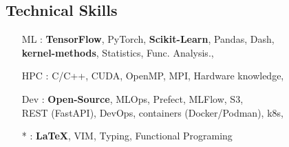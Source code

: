 \documentclass[10pt]{article} %
\begin{document}
\begin{paracol}{2}
\section{Technical Skills}
%
%
%
%
%
%
%
\begin{itemize}[noitemsep]
    \item[ML]: \textbf{TensorFlow}, PyTorch, \textbf{Scikit-Learn},
      Pandas, Dash, \\ \textbf{kernel-methods}, Statistics, Func.
      Analysis.,
    \item[HPC]: C/C++, CUDA, OpenMP, MPI, Hardware knowledge,
    \item[Dev]: \textbf{Open-Source}, MLOps, Prefect, MLFlow, S3, \\ REST
      (FastAPI), DevOps, containers (Docker/Podman), k8s,
    \item[*]: \textbf{\LaTeX}, VIM, Typing, Functional Programing
%
%
\end{itemize}
%
%
%
%
%

\end{paracol}
\end{document}
